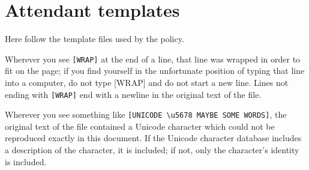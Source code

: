 %
%
%
\chapter{Attendant templates}
\label{AttendantTemplates}
Here follow the template files used by the policy.

Wherever you see \verb![WRAP]! at the end of a line, that line was wrapped
in order to fit on the page; if you find yourself in the unfortunate
position of typing that line into a computer, do not type [WRAP] and do
not start a new line. Lines not ending with \verb![WRAP]! end with a
newline in the original text of the file.

Wherever you see something like \verb![UNICODE \u5678 MAYBE SOME WORDS]!,
the original text of the file contained a Unicode character which could
not be reproduced exactly in this document. If the Unicode character
database includes a description of the character, it is included; if not,
only the character's identity is included.


